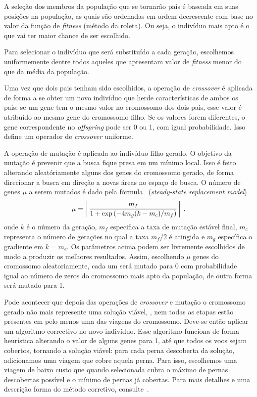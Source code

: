 A seleção dos membros da população que se tornarão pais é baseada em suas posições na população, as
quais são ordenadas em ordem decrescente com base no valor da função de {\it fitness} (método da
roleta). Ou seja, o indivíduo mais apto é o que vai ter maior chance de ser escolhido.

Para selecionar o indivíduo que será substituído a cada geração, escolhemos uniformemente dentre
todos aqueles que apresentam valor de {\it fitness} menor do que da média da população.

Uma vez que dois pais tenham sido escolhidos, a operação de {\it crossover} é aplicada de forma a
se obter um novo indivíduo que herde características de ambos os pais: se um gene tem o mesmo valor
no cromossomo dos dois pais, esse valor é atribuído ao mesmo gene do cromossomo filho. Se os valores
forem diferentes, o gene correspondente no {\it offspring} pode ser 0 ou 1, com igual probabilidade.
Isso define um operador de {\it crossover} uniforme.

A operação de mutação é aplicada ao indivíduo filho gerado. O objetivo da mutação é prevenir que a
busca fique presa em um mínimo local. Isso é feito alterando aleatóriamente alguns dos genes do
cromossomo gerado, de forma direcionar a busca em direção a novas áreas no espaço de busca. O número
de genes $\mu$ a serem mutados é dado pela fórmula~\cite{beasley96} ({\it steady-state replacement
model})
%
\begin{equation*}
\mu	= \left\lceil \frac{m_f}{1+\exp{\left(-4m_g(k - m_c)/m_f\right)}} \right\rceil \, ,
\end{equation*}
%
onde $k$ é o número da geração, $m_f$ especifica a taxa de mutação estável final, $m_c$ representa o
número de gerações no qual a taxa $m_f/2$ é atingida e $m_g$ específica o gradiente em $k = m_c$. Os
parâmetros acima podem ser livremente escolhidos de modo a produzir os melhores resultados. Assim,
escolhendo $\mu$ genes do cromossomo aleatoriamente, cada um será mutado para 0 com probabilidade
igual ao número de zeros do cromossomo mais apto da população, de outra forma será mutado para 1.

Pode acontecer que depois das operações de {\it crossover} e mutação o cromossomo gerado não mais
represente uma solução viável, \ie, nem todas as etapas estão presentes em pelo menos uma das
viagens do cromossomo. Deve-se então aplicar um algoritmo correctivo no novo indivíduo. Esse
algoritmo funciona de forma heurística alterando o valor de alguns genes para 1, até que todos os
voos sejam cobertos, tornando a solução viável: para cada perna descoberta da solução, adicionamos
uma viagem que cobre aquela perna. Para isso, escolhemos uma viagem de baixo custo que quando
selecionada cubra o máximo de pernas descobertas possível e o mínimo de pernas já cobertas. Para
mais detalhes e uma descrição forma do método corretivo, consulte~\cite{beasley96}.

